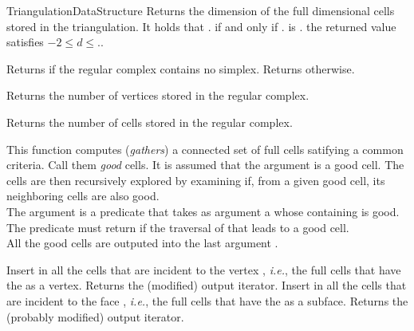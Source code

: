 \begin{ccRefConcept}{TriangulationDataStructure}
 { Returns the dimension of the
full dimensional cells stored in the triangulation. It holds that
\ccVar. if and only if \ccVar. is
. \ccPostcond the returned value  satisfies 
$-2\leq d \leq$\ccVar.. }

 { Returns  if the regular complex
contains no simplex. Returns  otherwise. }

{Returns the number of vertices stored in the regular complex.}

{Returns the number of cells stored in the regular complex.}

{}

{}

{This function computes (\emph{gathers}) a connected set of full cells
satifying a common criteria. Call them \emph{good} cells. It is assumed
that the argument  is a good cell. The cells are then
recursively explored by examining if, from a given good cell, its neighboring
cells are also good.\\
The argument  is a predicate that takes as argument a 
whose containing  is good. The predicate must return 
if the traversal of that  leads to a good cell.\\
All the good cells are outputed into the last argument .}

{Insert in  all the cells that are incident to the vertex
, \emph{i.e.}, the full cells that have the  as a vertex.
Returns the (modified) output iterator.
}
{Insert in  all the cells that are incident to the face ,
\emph{i.e.}, the full cells that have the  as a subface.
Returns the (probably modified) output iterator.
}


\end{ccRefConcept}
